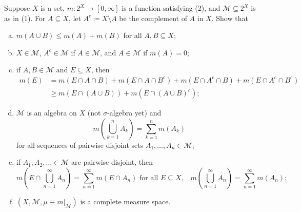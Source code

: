 \documentclass[10pt]{article}
\providecommand{\ii}{\item}
\begin{document}
\begin{problem}
    Suppose $X$ is a set, $m\colon 2^X\to[0,\infty]$ is a function satisfying
    (2), and $\mathcal M\subseteq 2^X$ is as in (1).
    For $A\subseteq X$, let $A^c\coloneq X\setminus A$
    be the complement of $A$ in $X$. Show that
    \begin{enumerate}[(a)]
	\ii $m(A\cup B)\le m(A) + m(B)$ for all $A,B\subseteq X$;
	\ii $X\in\mathcal M$, $A^c\in\mathcal M$ if $A\in\mathcal M$,
	and $A\in\mathcal M$ if $m(A) = 0$;
	\ii if $A,B\in\mathcal M$ and $E\subseteq X$, then
	\begin{align*}
	    m(E) &= m(E\cap A\cap B) + m(E\cap A\cap B^c)
	    + m(E\cap A^c\cap B) + m(E\cap A^c\cap B^c)\\
	    &\ge m(E\cap(A\cup B)) + m(E\cap(A\cup B)^c);
	\end{align*}
	\ii $\mathcal M$ is an algebra on $X$ (not $\sigma$-algebra yet) and
	\begin{equation*}
	    m\left(\bigcup_{k=1}^n A_k\right) = \sum_{k=1}^n m(A_k)
	\end{equation*}
	for all sequences of pairwise disjoint sets
	$A_1,\dots, A_n\in\mathcal M$;
	\ii if $A_1,A_2,\ldots\in\mathcal M$ are pairwise disjoint, then
	\begin{equation*}
	    m\left(E\cap \bigcup_{n=1}^\infty A_n\right) =
	    \sum_{n=1}^\infty m(E\cap A_n)
	    \text{ for all $E\subseteq X$,}\quad
	    m\left(\bigcup_{n=1}^\infty A_n\right) = \sum_{n=1}^\infty m(A_n);
	\end{equation*}
	\ii $(X,\mathcal M,\mu\equiv m|_{\mathcal M})$
	is a complete measure space.
\end{enumerate}
\end{problem}
\end{document}
